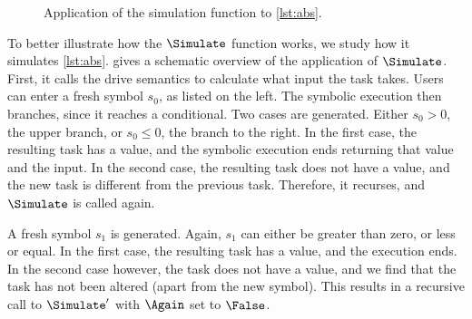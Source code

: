 \begin{figure*}[t]
\caption{Application of the simulation function to \cref{lst:abs}.}
\label{diagram:simapp}
\end{figure*}

To better illustrate how the $\Simulate$ function works, we study how it simulates \cref{lst:abs}.
 gives a schematic overview of the application of $\Simulate$.
First, it calls the drive semantics to calculate what input the task takes.
Users can enter a fresh symbol $s_0$, as listed on the left.
The symbolic execution then branches, since it reaches a conditional.
Two cases are generated. Either $s_0>0$, the upper branch, or $s_0\leq0$, the  branch to the right.
In the first case, the resulting task has a value, and the symbolic execution ends returning that value and the input.
In the second case, the resulting task does not have a value, and the new task is different from the previous task.
Therefore, it recurses, and $\Simulate$ is called again.

A fresh symbol $s_1$ is generated.
Again, $s_1$ can either be greater than zero, or less or equal.
In the first case, the resulting task has a value, and the execution ends.
In the second case however, the task does not have a value, and we find that the task has not been altered (apart from the new symbol).
This results in a recursive call to $\Simulate'$ with $\Again$ set to $\False$.

